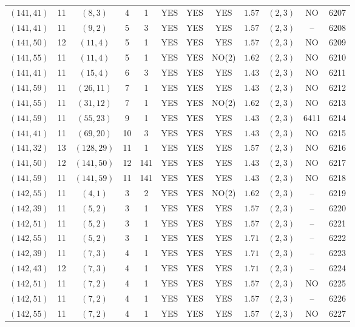 \begin{longtable}{|c|c|c|c|c|c|c|c|c|c|c|c|}
$(141,41)$ & 11 & $(8,3)$ & 4 & 1 & YES & YES & YES & $1.57$ & $(2,3)$ & NO & 6207\\
$(141,41)$ & 11 & $(9,2)$ & 5 & 3 & YES & YES & YES & $1.57$ & $(2,3)$ & -- & 6208\\
$(141,50)$ & 12 & $(11,4)$ & 5 & 1 & YES & YES & YES & $1.57$ & $(2,3)$ & NO & 6209\\
$(141,55)$ & 11 & $(11,4)$ & 5 & 1 & YES & YES & NO(2) & $1.62$ & $(2,3)$ & NO & 6210\\
$(141,41)$ & 11 & $(15,4)$ & 6 & 3 & YES & YES & YES & $1.43$ & $(2,3)$ & NO & 6211\\
$(141,59)$ & 11 & $(26,11)$ & 7 & 1 & YES & YES & YES & $1.43$ & $(2,3)$ & NO & 6212\\
$(141,55)$ & 11 & $(31,12)$ & 7 & 1 & YES & YES & NO(2) & $1.62$ & $(2,3)$ & NO & 6213\\
$(141,59)$ & 11 & $(55,23)$ & 9 & 1 & YES & YES & YES & $1.43$ & $(2,3)$ & 6411 & 6214\\
$(141,41)$ & 11 & $(69,20)$ & 10 & 3 & YES & YES & YES & $1.43$ & $(2,3)$ & NO & 6215\\
$(141,32)$ & 13 & $(128,29)$ & 11 & 1 & YES & YES & YES & $1.57$ & $(2,3)$ & NO & 6216\\
$(141,50)$ & 12 & $(141,50)$ & 12 & 141 & YES & YES & YES & $1.43$ & $(2,3)$ & NO & 6217\\
$(141,59)$ & 11 & $(141,59)$ & 11 & 141 & YES & YES & YES & $1.43$ & $(2,3)$ & NO & 6218\\
$(142,55)$ & 11 & $(4,1)$ & 3 & 2 & YES & YES & NO(2) & $1.62$ & $(2,3)$ & -- & 6219\\
$(142,39)$ & 11 & $(5,2)$ & 3 & 1 & YES & YES & YES & $1.57$ & $(2,3)$ & -- & 6220\\
$(142,51)$ & 11 & $(5,2)$ & 3 & 1 & YES & YES & YES & $1.57$ & $(2,3)$ & -- & 6221\\
$(142,55)$ & 11 & $(5,2)$ & 3 & 1 & YES & YES & YES & $1.71$ & $(2,3)$ & -- & 6222\\
$(142,39)$ & 11 & $(7,3)$ & 4 & 1 & YES & YES & YES & $1.71$ & $(2,3)$ & -- & 6223\\
$(142,43)$ & 12 & $(7,3)$ & 4 & 1 & YES & YES & YES & $1.71$ & $(2,3)$ & -- & 6224\\
$(142,51)$ & 11 & $(7,2)$ & 4 & 1 & YES & YES & YES & $1.57$ & $(2,3)$ & NO & 6225\\
$(142,51)$ & 11 & $(7,2)$ & 4 & 1 & YES & YES & YES & $1.57$ & $(2,3)$ & -- & 6226\\
$(142,55)$ & 11 & $(7,2)$ & 4 & 1 & YES & YES & YES & $1.57$ & $(2,3)$ & NO & 6227\\

\end{longtable}
